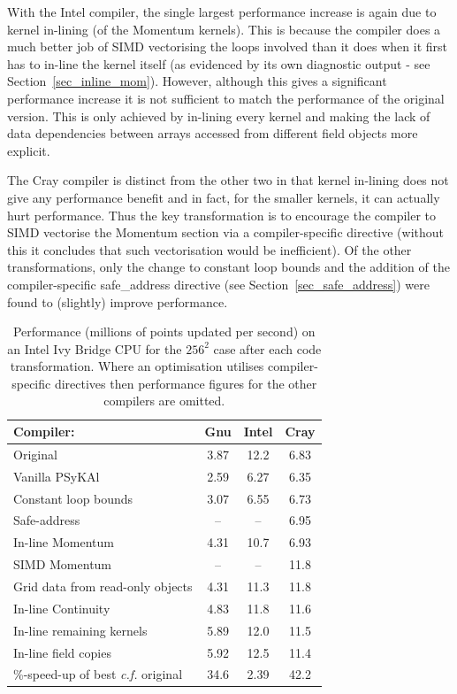 \documentclass[gmd, manuscript]{copernicus}
\begin{document}
With the Intel compiler, the single largest performance increase is
again due to kernel in-lining (of the Momentum kernels). This is
because the compiler does a much better job of SIMD vectorising the
loops involved than it does when it first has to in-line the kernel
itself (as evidenced by its own diagnostic output - see
Section~\ref{sec_inline_mom}). However, although this gives a
significant performance increase it is not sufficient to match the
performance of the original version. This is only achieved by
in-lining every kernel and making the lack of data dependencies
between arrays accessed from different field objects more explicit.

The Cray compiler is distinct from the other two in that kernel
in-lining does not give any performance benefit and in fact, for the
smaller kernels, it can actually hurt performance. Thus the key
transformation is to encourage the compiler to SIMD vectorise the
Momentum section via a compiler-specific directive (without this it
concludes that such vectorisation would be inefficient). Of the other
transformations, only the change to constant loop bounds and the
addition of the compiler-specific safe\_address directive (see
Section~\ref{sec_safe_address}) were found to (slightly) improve
performance.

\begin{table}[!t]
  \caption{Performance (millions of points updated per second) on an Intel
    Ivy Bridge CPU for the
  $256^2$ case after each code transformation. Where an optimisation
  utilises compiler-specific directives then performance figures for
  the other compilers are omitted.}
\label{TABLE_opt_breakdown}
\centering
\begin{tabular}{l|c|c|c}
\hline
Compiler:            & Gnu & Intel & Cray  \\
\hline
Original             & 3.87 & 12.2 & 6.83 \\
Vanilla {PS}y{KA}l   & 2.59 & 6.27 & 6.35 \\
Constant loop bounds & 3.07 & 6.55 & 6.73 \\
Safe-address         & --   & --   & 6.95 \\
In-line Momentum     & 4.31 & 10.7 & 6.93 \\
SIMD Momentum        & --   & --   & 11.8 \\
\parbox{2.5cm}{\raggedright Grid data from read-only objects} & 4.31 & 11.3 & 11.8 \\
In-line Continuity         & 4.83 & 11.8 & 11.6 \\
In-line remaining kernels  & 5.89 & 12.0 & 11.5 \\
In-line field copies       & 5.92 & 12.5 & 11.4 \\
\hline
\parbox{2.5cm}{\raggedright \%-speed-up of best \textit{c.f.} original} & 34.6 & 2.39 & 42.2 \\
\hline
\end{tabular}
\end{table}
\end{document}
